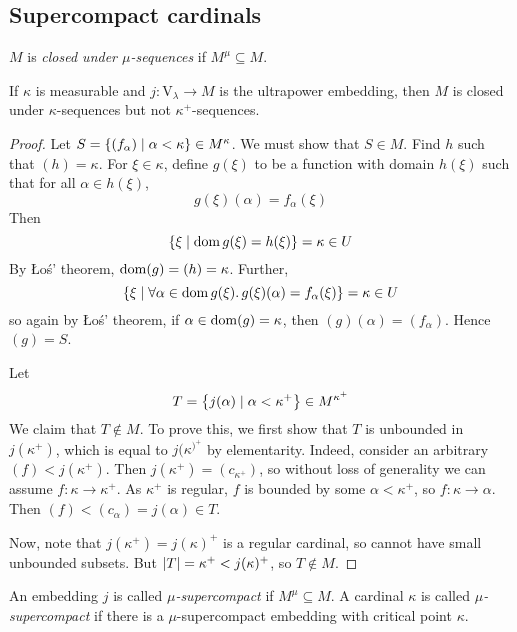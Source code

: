 \subsection{Supercompact cardinals}
\begin{definition}
    \( M \) is \emph{closed under \( \mu \)-sequences} if \( M^\mu \subseteq M \).
\end{definition}
\begin{theorem}
    If \( \kappa \) is measurable and \( j : \mathrm{V}_\lambda \to M \) is the ultrapower embedding, then \( M \) is closed under \( \kappa \)-sequences but not \( \kappa^+ \)-sequences.
\end{theorem}
\begin{proof}
    Let \( S = \qty{(f_\alpha) \mid \alpha < \kappa} \in M^\kappa \).
    We must show that \( S \in M \).
    Find \( h \) such that \( (h) = \kappa \).
    For \( \xi \in \kappa \), define \( g(\xi) \) to be a function with domain \( h(\xi) \) such that for all \( \alpha \in h(\xi) \),
    \[ g(\xi)(\alpha) = f_\alpha(\xi) \]
    Then
    \[ \qty{\xi \mid \operatorname{dom}g(\xi) = h(\xi)} = \kappa \in U \]
    By \L{}o\'s' theorem, \( \operatorname{dom} (g) = (h) = \kappa \).
    Further,
    \[ \qty{\xi \mid \forall \alpha \in \operatorname{dom}g(\xi).\, g(\xi)(\alpha) = f_\alpha(\xi)} = \kappa \in U \]
    so again by \L{}o\'s' theorem, if \( \alpha \in \operatorname{dom} (g) = \kappa \), then \( (g)(\alpha) = (f_\alpha) \).
    Hence \( (g) = S \).

    Let
    \[ T = \qty{j(\alpha) \mid \alpha < \kappa^+} \in M^{\kappa^+} \]
    We claim that \( T \notin M \).
    To prove this, we first show that \( T \) is unbounded in \( j(\kappa^+) \), which is equal to \( j(\kappa^)^+ \) by elementarity.
    Indeed, consider an arbitrary \( (f) < j(\kappa^+) \).
    Then \( j(\kappa^+) = (c_{\kappa^+}) \), so without loss of generality we can assume \( f : \kappa \to \kappa^+ \).
    As \( \kappa^+ \) is regular, \( f \) is bounded by some \( \alpha < \kappa^+ \), so \( f : \kappa \to \alpha \).
    Then \( (f) < (c_\alpha) = j(\alpha) \in T \).

    Now, note that \( j(\kappa^+) = j(\kappa)^+ \) is a regular cardinal, so cannot have small unbounded subsets.
    But \( \abs{T} = \kappa^+ < j(\kappa)^+ \), so \( T \notin M \).
\end{proof}
\begin{definition}
    An embedding \( j \) is called \emph{\( \mu \)-supercompact} if \( M^\mu \subseteq M \).
    A cardinal \( \kappa \) is called \emph{\( \mu \)-supercompact} if there is a \( \mu \)-supercompact embedding with critical point \( \kappa \).
\end{definition}
